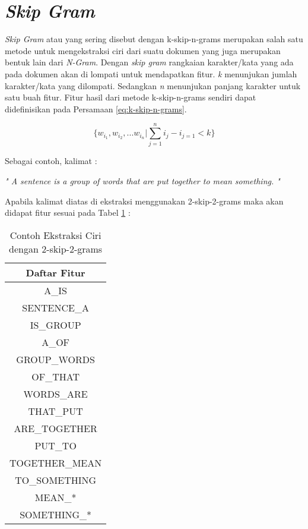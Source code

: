 \documentclass[../Proposal.tex]{subfiles}
\begin{document}
	\section{\textit{Skip Gram}}
	\textit{Skip Gram} atau yang sering disebut dengan k-skip-n-grams merupakan salah satu metode untuk mengekstraksi ciri dari suatu dokumen yang juga merupakan bentuk lain dari \textit{N-Gram}. Dengan \textit{skip gram} rangkaian karakter/kata yang ada pada dokumen akan di lompati untuk mendapatkan fitur. \textit{k} menunjukan jumlah karakter/kata yang dilompati. Sedangkan \textit{n} menunjukan panjang karakter untuk satu buah fitur. Fitur hasil dari metode k-skip-n-grams sendiri dapat didefinisikan pada Persamaan \ref{eq:k-skip-n-grams}\cite{skipgram}.

	\begin{center}
	\begin{equation}
		\{ w_{i_{1}}, w_{i_{2}}, ... w_{i_{n}} | \sum_{j=1}^{n} i_{j}-i_{j=1} < k \}
		\label{eq:k-skip-n-grams}
	\end{equation} 
	\end{center}

	\noindent 

	\noindent Sebagai contoh, kalimat : 

	\begin{center}
		\textit{" A sentence is a group of words that are put together to mean something. "}
	\end{center}

	\noindent Apabila kalimat diatas di ekstraksi menggunakan 2-skip-2-grams maka akan didapat fitur sesuai pada Tabel \ref{generated-feature} :


		\begin{table}[H]
			\small
			\caption{Contoh Ekstraksi Ciri dengan 2-skip-2-grams}
			\label{generated-feature}
			\centering
			\begin{tabular}{cl}
				\hline
				\multicolumn{2}{c}{Daftar Fitur}   \\ \hline
				\multicolumn{2}{c}{A\_IS}          \\
				\multicolumn{2}{c}{SENTENCE\_A}    \\
				\multicolumn{2}{c}{IS\_GROUP}      \\
				\multicolumn{2}{c}{A\_OF}          \\
				\multicolumn{2}{c}{GROUP\_WORDS}   \\
				\multicolumn{2}{c}{OF\_THAT}       \\
				\multicolumn{2}{c}{WORDS\_ARE}     \\
				\multicolumn{2}{c}{THAT\_PUT}      \\
				\multicolumn{2}{c}{ARE\_TOGETHER}  \\
				\multicolumn{2}{c}{PUT\_TO}        \\
				\multicolumn{2}{c}{TOGETHER\_MEAN} \\
				\multicolumn{2}{c}{TO\_SOMETHING}  \\
				\multicolumn{2}{c}{MEAN\_*}        \\
				\multicolumn{2}{c}{SOMETHING\_*}   \\ \hline
			\end{tabular}

		\end{table}
	
\end{document}
